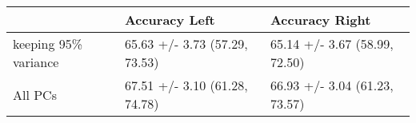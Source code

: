 \begin{tabular}{lll}
\toprule
{} &                  Accuracy Left &                 Accuracy Right \\
\midrule
keeping 95\% variance &  65.63 +/- 3.73 (57.29, 73.53) &  65.14 +/- 3.67 (58.99, 72.50) \\
All PCs              &  67.51 +/- 3.10 (61.28, 74.78) &  66.93 +/- 3.04 (61.23, 73.57) \\
\bottomrule
\end{tabular}
